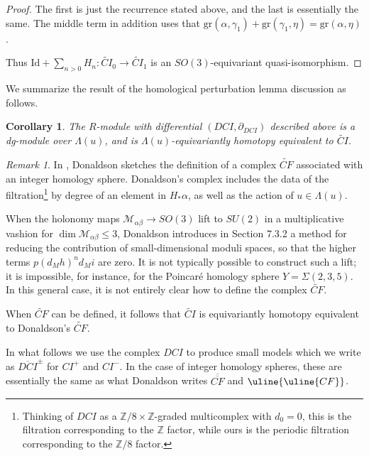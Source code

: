 \documentclass{memo-l}
\newtheorem{corollary}[theorem]{Corollary}
\theoremstyle{definition}
\theoremstyle{remark}
\newtheorem{remark}[theorem]{Remark}
\numberwithin{section}{chapter}
\numberwithin{equation}{chapter}
\begin{document}
\begin{proof}
The first is just the recurrence stated above, and the last is essentially the same. The middle term in addition uses that $\text{gr}(\alpha, \gamma_1) + \text{gr}(\gamma_1, \eta) = \text{gr}(\alpha, \eta)$.

Thus $\text{Id} + \sum_{n>0} H_n: \widetilde{CI}_0 \to \widetilde{CI}_1$ is an $SO(3)$-equivariant quasi-isomorphism. 
\end{proof}

We summarize the result of the homological perturbation lemma discussion as follows.

\begin{corollary}\label{DCI}The $R$-module with differential $(DCI,\partial_{DCI})$ described above is a dg-module over $\Lambda(u)$, and is $\Lambda(u)$-equivariantly homotopy equivalent to $\widetilde{CI}$. 
\end{corollary}

\begin{remark}In \cite[Section~7.3.3]{Don}, Donaldson sketches the definition of a complex $\widetilde{CF}$ associated with an integer homology sphere. Donaldson's complex includes the data of the filtration\footnote{Thinking of $DCI$ as a $\mathbb Z/8 \times \mathbb Z$-graded multicomplex with $d_0 = 0$, this is the filtration corresponding to the $\mathbb Z$ factor, while ours is the periodic filtration corresponding to the $\mathbb Z/8$ factor.} by degree of an element in $H_* \alpha$, as well as the action of $u \in \Lambda(u)$. 

When the holonomy maps $\mathcal M_{\alpha \beta} \to SO(3)$ lift to $SU(2)$ in a multiplicative vashion for $\dim \mathcal M_{\alpha \beta} \le 3$, Donaldson introduces in Section 7.3.2 a method for reducing the contribution of small-dimensional moduli spaces, so that the higher terms $p (d_M h)^n d_M i$ are zero. It is not typically possible to construct such a lift; it is impossible, for instance, for the Poincar\'e homology sphere $Y = \Sigma(2,3,5)$. In this general case, it is not entirely clear how to define the complex $\widetilde{CF}$.

When $\widetilde{CF}$ can be defined, it follows that $\widetilde{CI}$ is equivariantly homotopy equivalent to Donaldson's $\widetilde{CF}$.
\end{remark}

In what follows we use the complex $DCI$ to produce small models which we write as $\overline{DCI}^\pm$ for $CI^+$ and $CI^-$. In the case of integer homology spheres, these are essentially the same as what Donaldson writes $\overline{\overline{CF}}$ and $\uline{\uline{CF}}$.
\end{document}
